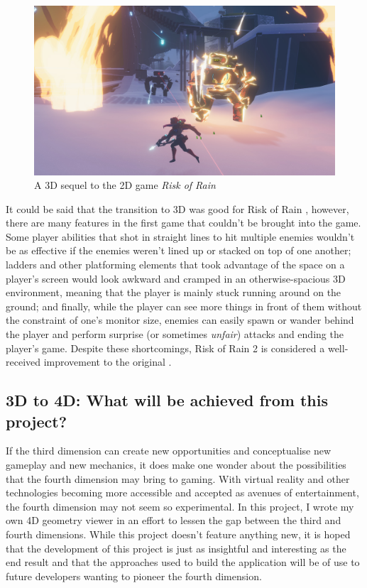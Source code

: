 \documentclass[11pt, a4paper]{article}
\begin{document}
\begin{figure}[!h]
  \centering
  \includegraphics[width=\textwidth]{img/risk_of_rain_2.jpg}
  \caption{A 3D sequel to the 2D game \emph{Risk of Rain} \parencite{riskofrain2steampage}}
  \label{fig:riskofrain2}
\end{figure}

It could be said that the transition to 3D was good for Risk of Rain \parencite*{riskofrain}, however, there are many features in the first game that couldn't be brought into the game. Some player abilities that shot in straight lines to hit multiple enemies wouldn't be as effective if the enemies weren't lined up or stacked on top of one another; ladders and other platforming elements that took advantage of the space on a player's screen would look awkward and cramped in an otherwise-spacious 3D environment, meaning that the player is mainly stuck running around on the ground; and finally, while the player can see more things in front of them without the constraint of one's monitor size, enemies can easily spawn or wander behind the player and perform surprise (or sometimes \emph{unfair}) attacks and ending the player's game. Despite these shortcomings, Risk of Rain 2 \parencite*{riskofrain2} is considered a well-received improvement to the original \parencite{riskofrain2steampage}.

\subsection{3D to 4D: What will be achieved from this project?}

If the third dimension can create new opportunities and conceptualise new gameplay and new mechanics, it does make one wonder about the possibilities that the fourth dimension may bring to gaming. With virtual reality and other technologies becoming more accessible and accepted as avenues of entertainment, the fourth dimension may not seem so experimental. In this project, I wrote my own 4D geometry viewer in an effort to lessen the gap between the third and fourth dimensions. While this project doesn't feature anything new, it is hoped that the development of this project is just as insightful and interesting as the end result and that the approaches used to build the application will be of use to future developers wanting to pioneer the fourth dimension.
\end{document}
